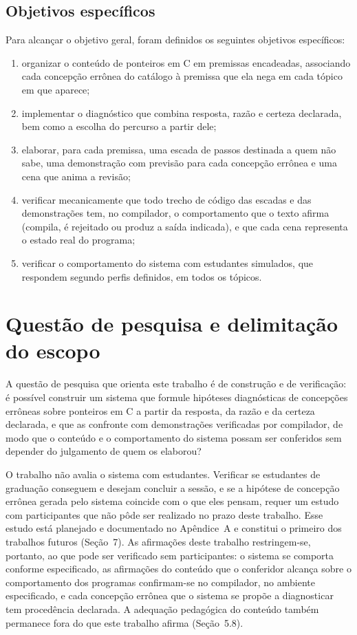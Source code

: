 \subsection{Objetivos específicos}

Para alcançar o objetivo geral, foram definidos os seguintes objetivos específicos:

\begin{enumerate}
\item organizar o conteúdo de ponteiros em C em premissas encadeadas, associando cada concepção errônea do catálogo à premissa que ela nega em cada tópico em que aparece;
\item implementar o diagnóstico que combina resposta, razão e certeza declarada, bem como a escolha do percurso a partir dele;
\item elaborar, para cada premissa, uma escada de passos destinada a quem não sabe, uma demonstração com previsão para cada concepção errônea e uma cena que anima a revisão;
\item verificar mecanicamente que todo trecho de código das escadas e das demonstrações tem, no compilador, o comportamento que o texto afirma (compila, é rejeitado ou produz a saída indicada), e que cada cena representa o estado real do programa;
\item verificar o comportamento do sistema com estudantes simulados, que respondem segundo perfis definidos, em todos os tópicos.
\end{enumerate}

\section{Questão de pesquisa e delimitação do escopo}

A questão de pesquisa que orienta este trabalho é de construção e de verificação: é possível construir um sistema que formule hipóteses diagnósticas de concepções errôneas sobre ponteiros em C a partir da resposta, da razão e da certeza declarada, e que as confronte com demonstrações verificadas por compilador, de modo que o conteúdo e o comportamento do sistema possam ser conferidos sem depender do julgamento de quem os elaborou?

O trabalho não avalia o sistema com estudantes. Verificar se estudantes de graduação conseguem e desejam concluir a sessão, e se a hipótese de concepção errônea gerada pelo sistema coincide com o que eles pensam, requer um estudo com participantes que não pôde ser realizado no prazo deste trabalho. Esse estudo está planejado e documentado no Apêndice~A e constitui o primeiro dos trabalhos futuros (Seção~7). As afirmações deste trabalho restringem-se, portanto, ao que pode ser verificado sem participantes: o sistema se comporta conforme especificado, as afirmações do conteúdo que o conferidor alcança sobre o comportamento dos programas confirmam-se no compilador, no ambiente especificado, e cada concepção errônea que o sistema se propõe a diagnosticar tem procedência declarada. A adequação pedagógica do conteúdo também permanece fora do que este trabalho afirma (Seção~5.8).

